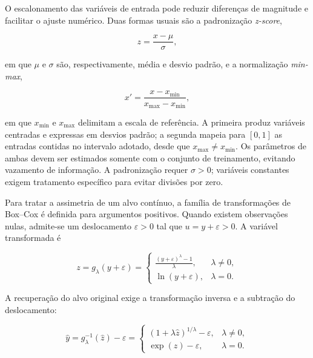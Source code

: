 O escalonamento das variáveis de entrada pode reduzir diferenças de
magnitude e facilitar o ajuste numérico. Duas formas usuais são a
padronização \textit{z-score},

\begin{equation}
\label{eq:zscore}
z=\frac{x-\mu}{\sigma},
\end{equation}

\noindent em que $\mu$ e $\sigma$ são, respectivamente, média e desvio
padrão, e a normalização \textit{min-max},

\begin{equation}
\label{eq:minmax}
x'=\frac{x-x_{\min}}{x_{\max}-x_{\min}},
\end{equation}

\noindent em que $x_{\min}$ e $x_{\max}$ delimitam a escala de
referência. A primeira produz variáveis centradas e expressas em desvios
padrão; a segunda mapeia para $[0,1]$ as entradas contidas no intervalo
adotado, desde que $x_{\max}\neq x_{\min}$. Os parâmetros de ambas devem
ser estimados somente com o conjunto de treinamento, evitando vazamento
de informação. A padronização requer $\sigma>0$; variáveis constantes
exigem tratamento específico para evitar divisões por zero.

Para tratar a assimetria de um alvo contínuo, a família de transformações
de Box--Cox \cite{boxcox1964} é definida para argumentos positivos.
Quando existem observações nulas, admite-se um deslocamento
$\varepsilon>0$ tal que $u=y+\varepsilon>0$. A variável transformada é

\begin{equation}
\label{eq:boxcox}
z=g_{\lambda}(y+\varepsilon)=
\begin{cases}
\displaystyle\frac{(y+\varepsilon)^{\lambda}-1}{\lambda}, & \lambda\neq 0,\\[4pt]
\ln(y+\varepsilon), & \lambda=0.
\end{cases}
\end{equation}

A recuperação do alvo original exige a transformação inversa e a
subtração do deslocamento:

\begin{equation}
\label{eq:boxcox_inversa}
\widehat{y}=g_{\lambda}^{-1}(\widehat{z})-\varepsilon=
\begin{cases}
(1+\lambda\widehat{z})^{1/\lambda}-\varepsilon,
& \lambda\neq 0,\\
\exp(\widehat{z})-\varepsilon, & \lambda=0.
\end{cases}
\end{equation}

